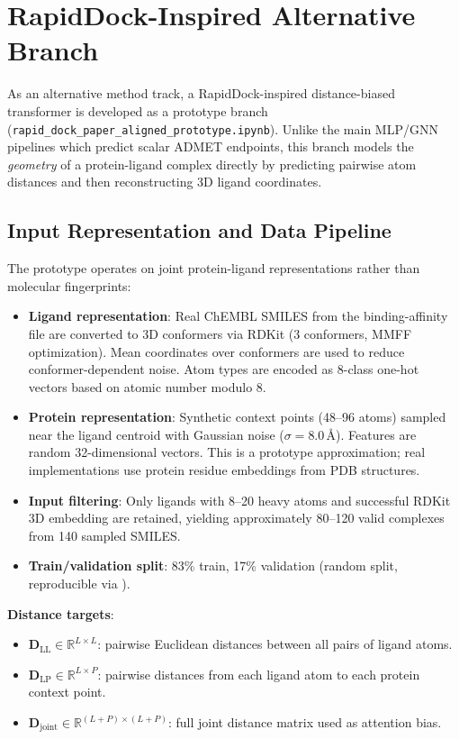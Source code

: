 \documentclass[a4paper,11pt,twoside]{report}
\begin{document}
\section{RapidDock-Inspired Alternative Branch}
\label{sec:rapiddock}

As an alternative method track, a RapidDock-inspired distance-biased transformer is developed as a prototype branch (\texttt{rapid\_dock\_paper\_aligned\_prototype.ipynb}). Unlike the main MLP/GNN pipelines which predict scalar ADMET endpoints, this branch models the \textit{geometry} of a protein-ligand complex directly by predicting pairwise atom distances and then reconstructing 3D ligand coordinates.

\subsection{Input Representation and Data Pipeline}

The prototype operates on joint protein-ligand representations rather than molecular fingerprints:
\begin{itemize}
  \item \textbf{Ligand representation}: Real ChEMBL SMILES from the binding-affinity file are converted to 3D conformers via RDKit  (3 conformers, MMFF optimization). Mean coordinates over conformers are used to reduce conformer-dependent noise. Atom types are encoded as 8-class one-hot vectors based on atomic number modulo 8.
  \item \textbf{Protein representation}: Synthetic context points (48--96 atoms) sampled near the ligand centroid with Gaussian noise ($\sigma = 8.0$\,\AA). Features are random 32-dimensional vectors. This is a prototype approximation; real implementations use protein residue embeddings from PDB structures.
  \item \textbf{Input filtering}: Only ligands with 8--20 heavy atoms and successful RDKit 3D embedding are retained, yielding approximately 80--120 valid complexes from 140 sampled SMILES.
  \item \textbf{Train/validation split}: 83\% train, 17\% validation (random split, reproducible via ).
\end{itemize}

\textbf{Distance targets}:
\begin{itemize}
  \item $\mathbf{D}_\text{LL} \in \mathbb{R}^{L \times L}$: pairwise Euclidean distances between all pairs of ligand atoms.
  \item $\mathbf{D}_\text{LP} \in \mathbb{R}^{L \times P}$: pairwise distances from each ligand atom to each protein context point.
  \item $\mathbf{D}_\text{joint} \in \mathbb{R}^{(L+P) \times (L+P)}$: full joint distance matrix used as attention bias.
\end{itemize}
\end{document}
